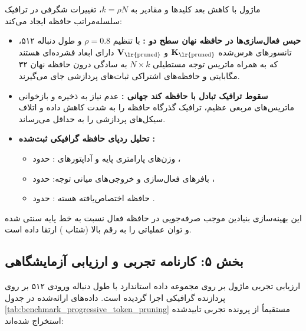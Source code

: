 ماژول  با کاهش بعد کلیدها و مقادیر به $k = \rho N$، تغییرات شگرفی در ترافیک سلسله‌مراتب حافظه ایجاد می‌کند:
\begin{itemize}
    \item \textbf{حبس فعال‌سازی‌ها در حافظه نهان سطح دو :} با تنظیم $\rho = 0.8$ و طول دنباله ۵۱۲، تانسورهای هرس‌شده $\mathbf{K}_{\text{\lr{pruned}}}$ و $\mathbf{V}_{\text{\lr{pruned}}}$ دارای ابعاد فشرده‌ای هستند که به همراه ماتریس توجه مستطیلی $N \times k$ به سادگی درون حافظه نهان ۳۲ مگابایتی  و حافظه‌های اشتراکی  ثبات‌های پردازشی  جای می‌گیرند.
    \item \textbf{سقوط ترافیک تبادل با حافظه کند جهانی :} عدم نیاز به ذخیره و بازخوانی ماتریس‌های مربعی عظیم، ترافیک گذرگاه حافظه را به شدت کاهش داده و اتلاف سیکل‌های پردازشی را به حداقل می‌رساند.
    \item \textbf{تحلیل ردپای حافظه گرافیکی ثبت‌شده :}
    \begin{itemize}
        \item وزن‌های پارامتری پایه و آداپتورهای : حدود ،
        \item بافرهای فعال‌سازی و خروجی‌های میانی توجه: حدود ،
        \item حافظه اختصاص‌یافته هسته : حدود .
    \end{itemize}
\end{itemize}
این بهینه‌سازی بنیادین موجب صرفه‌جویی  در حافظه فعال نسبت به خط پایه سنتی  شده و توان عملیاتی را به رقم بالا  (شتاب ) ارتقا داده است.

\subsection*{بخش ۵: کارنامه تجربی و ارزیابی آزمایشگاهی }
ارزیابی تجربی ماژول  بر روی مجموعه داده استاندارد  با طول دنباله ورودی ۵۱۲ بر روی پردازنده گرافیکی  اجرا گردیده است. داده‌های ارائه‌شده در جدول \ref{tab:benchmark_progressive_token_pruning} مستقیماً از پرونده تجربی تاییدشده استخراج شده‌اند:

